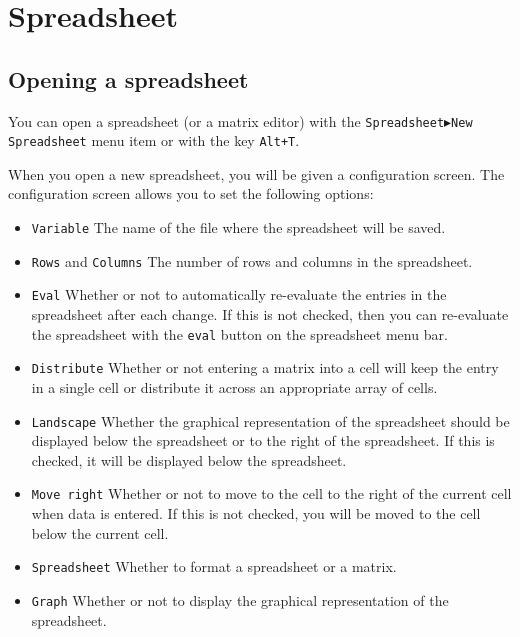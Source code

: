 \documentclass[a4paper,11pt]{book}
\begin{document}
\section{Spreadsheet}

\subsection{Opening a spreadsheet}

You can open a spreadsheet (or a matrix editor) with the
\texttt{Spreadsheet$\blacktriangleright$New Spreadsheet} menu item or
with the key \texttt{Alt+T}. 

When you open a new spreadsheet, you will be given a configuration screen.  
The configuration screen allows you to set the following options:
\begin{itemize}
  \item
  \texttt{Variable}
  The name of the file where the spreadsheet will be
  saved.
  \item
  \texttt{Rows} and \texttt{Columns}
  The number of rows and columns in the spreadsheet.  
  \item
  \texttt{Eval}
  Whether or not to automatically re-evaluate the entries in the
  spreadsheet after each change.  If this is not checked, then you can
  re-evaluate the spreadsheet with the \texttt{eval} button on the
  spreadsheet menu bar.
  \item
  \texttt{Distribute}
  Whether or not entering a matrix into a cell will keep the entry in
  a single cell or distribute it across an appropriate array of cells.
  \item
  \texttt{Landscape}
  Whether the graphical representation of the spreadsheet should be
  displayed below the spreadsheet or to the right of the spreadsheet.
  If this is checked, it will be displayed below the spreadsheet.
  \item
  \texttt{Move right}
  Whether or not to move to the cell to the right of the current cell
  when data is entered.  If this is not checked, you will be moved to
  the cell below the current cell.
  \item
  \texttt{Spreadsheet}
  Whether to format a spreadsheet or a matrix.
  \item
  \texttt{Graph}
  Whether or not to display the graphical representation of the
  spreadsheet. 
\end{itemize}
\end{document}
